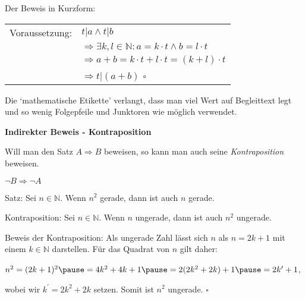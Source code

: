 \begin{frame}[fragile]

Der Beweis in Kurzform:

\begin{tabular}{l l}

Voraussetzung: &  $t|a \land t|b$ \\
& $\Rightarrow \exists k,l \in \mathbb{N}: a=k \cdot t \land b = l \cdot t$ \\
& $ \Rightarrow a+b= k \cdot t + l \cdot t = (k +l) \cdot t  $ \\
& $ \Rightarrow t | (a+b)  $ \hfill $\square$ \\
\end{tabular} \pause

Die `mathematische Etikette' verlangt, dass man viel Wert auf Begleittext legt und so wenig Folgepfeile und
Junktoren wie möglich verwendet.

\end{frame}

\begin{frame}[fragile]

\textbf{Indirekter Beweis - Kontraposition}

Will man den Satz $A \Rightarrow B$ beweisen, so kann man auch seine \textit{Kontraposition} beweisen.  

$\lnot B \Rightarrow \lnot A$ \pause

 
Satz: Sei $n \in \mathbb{N}$. Wenn $n^2$ gerade, dann ist auch $n$ gerade. \pause

Kontraposition:  \pause Sei $n \in \mathbb{N}$. Wenn $n$ ungerade, dann ist auch $n^2$ ungerade. \pause

Beweis der Kontraposition: Als ungerade Zahl lässt sich $n$ als $n = 2k+1$ mit einem $k \in \mathbb{N}$ darstellen. \pause Für das Quadrat von $n$ gilt daher: 

\quad $n^2=(2k+1)^2\pause=4k^2+4k+1\pause=2(2k^2+2k)+1\pause=2k^{\prime}+1$,

wobei wir $k^{\prime} = 2k^2+2k$ setzen. \pause Somit ist $n^2$ ungerade. \pause  \hfill $\square$
\end{frame}


